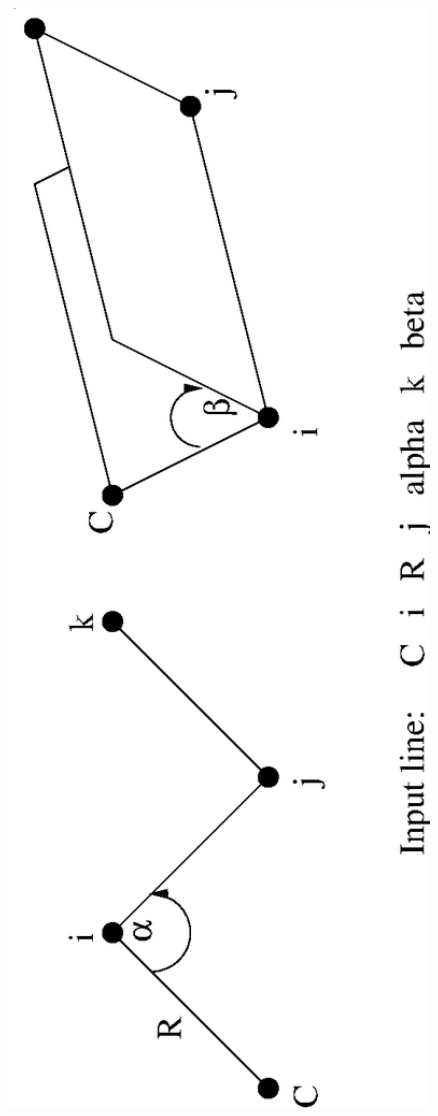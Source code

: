 \begin{figure}[htbp]
\centering
\begin{latexonly}
\ifx\pdfoutput\undefined
\includegraphics[angle=270,width=6in]{zmat1.eps}

\end{latexonly}
\end{figure}
